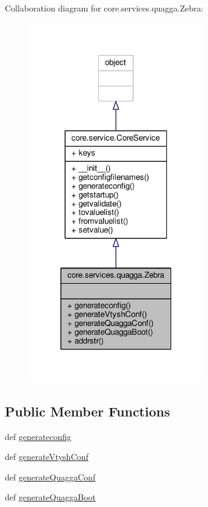 Collaboration diagram for core.\+services.\+quagga.\+Zebra\+:
\nopagebreak
\begin{figure}[H]
\begin{center}
\leavevmode
\includegraphics[width=217pt]{classcore_1_1services_1_1quagga_1_1_zebra__coll__graph}
\end{center}
\end{figure}
\subsection*{Public Member Functions}
\begin{DoxyCompactItemize}
\item 
def \hyperlink{classcore_1_1services_1_1quagga_1_1_zebra_ad00a68644ef1db34251ced2bd84b470a}{generateconfig}
\item 
def \hyperlink{classcore_1_1services_1_1quagga_1_1_zebra_a4e251500d8a092a9eaf6f0e1bccf685b}{generate\+Vtysh\+Conf}
\item 
def \hyperlink{classcore_1_1services_1_1quagga_1_1_zebra_aa6d2206229a63f73d722271247b6a072}{generate\+Quagga\+Conf}
\item 
def \hyperlink{classcore_1_1services_1_1quagga_1_1_zebra_ac651416f328aa7341372fe950f21ffa0}{generate\+Quagga\+Boot}
\end{DoxyCompactItemize}
